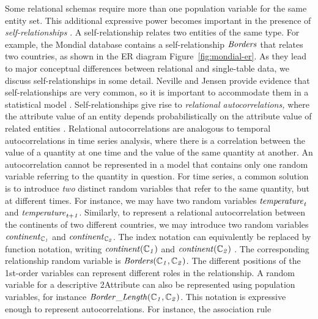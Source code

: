 \documentclass{acm_proc_article-sp}
\begin{document}
Some relational schemas require more than one population variable for the same entity set. 
This additional expressive power becomes important in the presence of {\em self-relationships} \cite{Heckerman+al:SRL07}. 
A self-relationship relates two entities of the same type.
For example, the Mondial database contains a self-relationship $\it{Borders}$ that relates two countries, as shown in the ER diagram Figure~\ref{fig:mondial-er}. As they lead to major conceptual differences between relational and single-table data, we discuss self-relationships in some detail. Neville and Jensen provide evidence that self-relationships are very common, so it is important to accommodate them in a statistical model \cite{Neville2007}. Self-relationships give rise to {\em relational autocorrelations,} where the attribute value of an entity depends probabilistically on the attribute value of related entities \cite{Neville2007}. 
Relational autocorrelations are analogous to temporal autocorrelations in time series analysis, where there is a correlation between the value of a quantity at one time and the value of the same quantity at another. An autocorrelation cannot be represented in a model that contains only one random variable referring to the quantity in question. For time series, a common solution is to introduce {\em two} distinct random variables  that refer to the same quantity, but at different times. For instance, we may have two random variables $\it{temperature}_{t}$ and $\it{temperature}_{t+1}$. Similarly, to represent a relational autocorrelation between the continents of two different countries, we may introduce two random variables $\it{continent}_{\mathbb{C}_{1}}$ and $\it{continent}_{\mathbb{C}_{2}}$. The index notation can equivalently be replaced by function notation, writing $\it{continent}(\mathbb{C}_{1})$ and $\it{continent}(\mathbb{C}_{2})$ \cite{Milch2005}. 
%
The corresponding relationship random variable is $\it{Borders}(\mathbb{C}_{1},\mathbb{C}_{2})$. The different positions of the 1st-order variables can represent different roles in the relationship. A random variable for a descriptive 2Attribute can also be represented using population variables, for instance $\it{Border\_Length}(\mathbb{C}_{1},\mathbb{C}_{2})$. %
This notation is expressive enough to represent autocorrelations. 
For instance, the association rule
\end{document}
